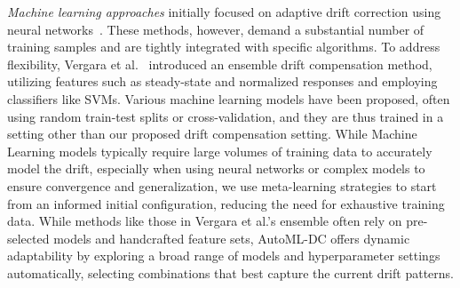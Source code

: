 \emph{Machine learning approaches} initially focused on adaptive drift correction using neural networks~\cite{kohonen}. These methods, however, demand a substantial number of training samples and are tightly integrated with specific algorithms. To address flexibility, Vergara et al.~\cite{VERGARA2012320} introduced an ensemble drift compensation method, utilizing features such as steady-state and normalized responses and employing classifiers like SVMs. 
Various machine learning models have been proposed, often using random train-test splits or cross-validation, and they are thus trained in a setting other than our proposed drift compensation setting. While Machine Learning models typically require large volumes of training data to accurately model the drift, especially when using neural networks or complex models to ensure convergence and generalization, we use meta-learning strategies to start from an informed initial configuration, reducing the need for exhaustive training data. While methods like those in Vergara et al.'s ensemble often rely on pre-selected models and handcrafted feature sets, AutoML-DC offers dynamic adaptability by exploring a broad range of models and hyperparameter settings automatically, selecting combinations that best capture the current drift patterns.